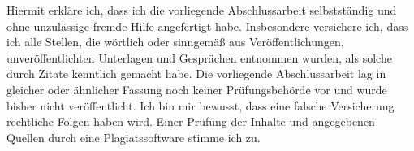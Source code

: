 Hiermit erkläre ich, dass ich die vorliegende Abschlussarbeit selbstständig und ohne unzulässige fremde Hilfe angefertigt habe. Insbesondere versichere ich, dass ich alle Stellen, die wörtlich oder sinngemäß aus Veröffentlichungen, unveröffentlichten Unterlagen und Gesprächen entnommen wurden, als solche durch Zitate kenntlich gemacht habe. Die vorliegende Abschlussarbeit lag in gleicher oder ähnlicher Fassung noch keiner Prüfungsbehörde vor und wurde bisher nicht veröffentlicht. Ich bin mir bewusst, dass eine falsche Versicherung rechtliche Folgen haben wird. Einer Prüfung der Inhalte und angegebenen Quellen durch eine Plagiatssoftware stimme ich zu.

